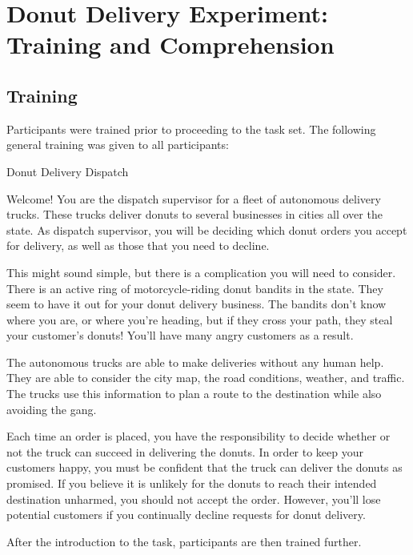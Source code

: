 \section{Donut Delivery Experiment: Training and Comprehension}
\subsection{Training}
Participants were trained prior to proceeding to the task set. The following general training was given to all participants:

\begin{quoting}
    Donut Delivery Dispatch

    Welcome! You are the dispatch supervisor for a fleet of autonomous delivery trucks. These trucks deliver donuts to several businesses in cities all over the state. As dispatch supervisor, you will be deciding which donut orders you accept for delivery, as well as those that you need to decline.

    This might sound simple, but there is a complication you will need to consider. There is an active ring of motorcycle-riding donut bandits in the state. They seem to have it out for your donut delivery business. The bandits don't know where you are, or where you're heading, but if they cross your path, they steal your customer's donuts! You'll have many angry customers as a result.

    The autonomous trucks are able to make deliveries without any human help. They are able to consider the city map, the road conditions, weather, and traffic. The trucks use this information to plan a route to the destination while also avoiding the gang.

    Each time an order is placed, you have the responsibility to decide whether or not the truck can succeed in delivering the donuts. In order to keep your customers happy, you must be confident that the truck can deliver the donuts as promised. If you believe it is unlikely for the donuts to reach their intended destination unharmed, you should not accept the order. However, you'll lose potential customers if you continually decline requests for donut delivery.
\end{quoting}

After the introduction to the task, participants are then trained further.

